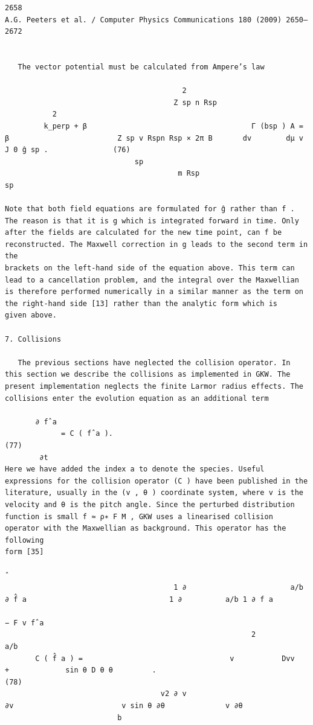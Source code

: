 \documentclass[a4paper]{article}
\newcommand{\gkwpagefont}{\fontsize{6.0pt}{7.55pt}\selectfont}
\begin{document}
\begin{Verbatim}[fontsize=\gkwpagefont]
2658                                                                              A.G. Peeters et al. / Computer Physics Communications 180 (2009) 2650–2672


   The vector potential must be calculated from Ampere’s law
                                                                                                                               
                                         2
                                       Z sp n Rsp
           2
         k_perp + β                                      Γ (bsp ) A = β                         Z sp v Rspn Rsp × 2π B       dv        dμ v  J 0 ĝ sp .               (76)
                              sp
                                        m Rsp                                            sp

Note that both field equations are formulated for ĝ rather than f . The reason is that it is g which is integrated forward in time. Only
after the fields are calculated for the new time point, can f be reconstructed. The Maxwell correction in g leads to the second term in the
brackets on the left-hand side of the equation above. This term can lead to a cancellation problem, and the integral over the Maxwellian
is therefore performed numerically in a similar manner as the term on the right-hand side [13] rather than the analytic form which is
given above.

7. Collisions

   The previous sections have neglected the collision operator. In this section we describe the collisions as implemented in GKW. The
present implementation neglects the finite Larmor radius effects. The collisions enter the evolution equation as an additional term

       ∂ fˆa
             = C ( fˆa ).                                                                                                                                              (77)
        ∂t
Here we have added the index a to denote the species. Useful expressions for the collision operator (C ) have been published in the
literature, usually in the (v , θ ) coordinate system, where v is the velocity and θ is the pitch angle. Since the perturbed distribution
function is small f ≈ ρ∗ F M , GKW uses a linearised collision operator with the Maxwellian as background. This operator has the following
form [35]
                                                                                                                             ˆ 
                                       1 ∂                        a/b ∂ f̂ a                                 1 ∂          a/b 1 ∂ f a
                                                                             − F v fˆa
                                                         2                       a/b
       C ( f̂ a ) =                                  v           Dvv                                +             sin θ D θ θ         .                                (78)
                                    v2 ∂ v                                 ∂v                         v sin θ ∂θ              v ∂θ
                          b


\end{Verbatim}
\end{document}
